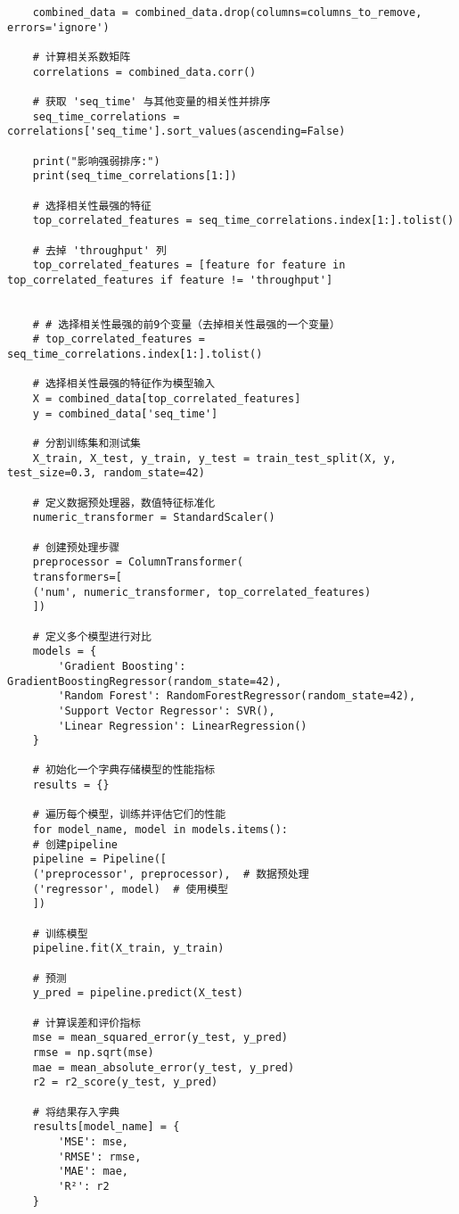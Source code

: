 \documentclass[bwprint]{gmcmthesis}
\begin{document}
\begin{lstlisting}
	combined_data = combined_data.drop(columns=columns_to_remove, errors='ignore')
	
	# 计算相关系数矩阵
	correlations = combined_data.corr()
	
	# 获取 'seq_time' 与其他变量的相关性并排序
	seq_time_correlations = correlations['seq_time'].sort_values(ascending=False)
	
	print("影响强弱排序:")
	print(seq_time_correlations[1:])
	
	# 选择相关性最强的特征
	top_correlated_features = seq_time_correlations.index[1:].tolist()
	
	# 去掉 'throughput' 列
	top_correlated_features = [feature for feature in top_correlated_features if feature != 'throughput']
	
	
	# # 选择相关性最强的前9个变量（去掉相关性最强的一个变量）
	# top_correlated_features = seq_time_correlations.index[1:].tolist()
	
	# 选择相关性最强的特征作为模型输入
	X = combined_data[top_correlated_features]
	y = combined_data['seq_time']
	
	# 分割训练集和测试集
	X_train, X_test, y_train, y_test = train_test_split(X, y, test_size=0.3, random_state=42)
	
	# 定义数据预处理器，数值特征标准化
	numeric_transformer = StandardScaler()
	
	# 创建预处理步骤
	preprocessor = ColumnTransformer(
	transformers=[
	('num', numeric_transformer, top_correlated_features)
	])
	
	# 定义多个模型进行对比
	models = {
		'Gradient Boosting': GradientBoostingRegressor(random_state=42),
		'Random Forest': RandomForestRegressor(random_state=42),
		'Support Vector Regressor': SVR(),
		'Linear Regression': LinearRegression()
	}
	
	# 初始化一个字典存储模型的性能指标
	results = {}
	
	# 遍历每个模型，训练并评估它们的性能
	for model_name, model in models.items():
	# 创建pipeline
	pipeline = Pipeline([
	('preprocessor', preprocessor),  # 数据预处理
	('regressor', model)  # 使用模型
	])
	
	# 训练模型
	pipeline.fit(X_train, y_train)
	
	# 预测
	y_pred = pipeline.predict(X_test)
	
	# 计算误差和评价指标
	mse = mean_squared_error(y_test, y_pred)
	rmse = np.sqrt(mse)
	mae = mean_absolute_error(y_test, y_pred)
	r2 = r2_score(y_test, y_pred)
	
	# 将结果存入字典
	results[model_name] = {
		'MSE': mse,
		'RMSE': rmse,
		'MAE': mae,
		'R²': r2
	}
	

\end{lstlisting}
\end{document}
